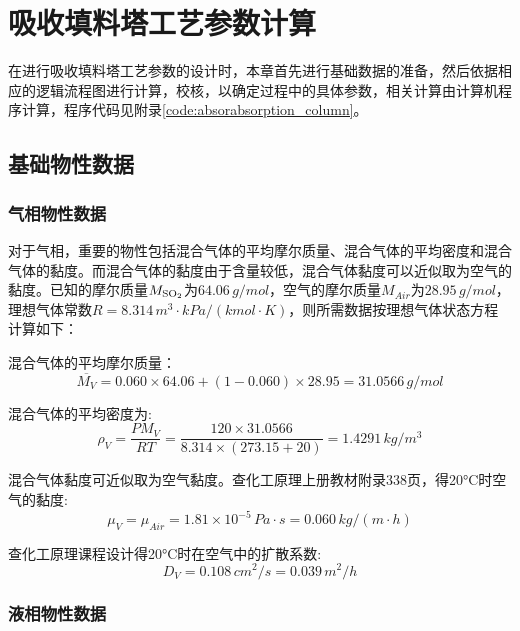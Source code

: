 \chapter{吸收填料塔工艺参数计算}

在进行吸收填料塔工艺参数的设计\cite{Design-of-Packed-Absorption-Column}时，本章首先进行基础数据的准备，然后依据相应的逻辑流程图进行计算，校核，以确定过程中的具体参数，相关计算由计算机程序计算，程序代码见附录\ref{code:absorabsorption_column}。

\section{基础物性数据}

\subsection{气相物性数据}

对于气相，重要的物性包括混合气体的平均摩尔质量、混合气体的平均密度和混合气体的黏度。而混合气体的黏度由于含量较低，混合气体黏度可以近似取为空气的黏度。已知的摩尔质量$M_{\ce{SO2}}$为$64.06 \, g/mol$，空气的摩尔质量$M_{Air}$为$28.95 \, g/mol$，理想气体常数$R=8.314 \, m^3 \cdot kPa/(kmol \cdot K)$，则所需数据按理想气体状态方程计算如下：

混合气体的平均摩尔质量：
\begin{equation}
	\overline{M_{V}} = 0.060 \times 64.06 + (1-0.060) \times 28.95 = 31.0566 \, g/mol
\end{equation}

混合气体的平均密度为:
\begin{equation}
	\rho_{V}=\frac{PM_{V}}{RT}=\frac{120\times31.0566}{8.314\times(273.15+20)}=1.4291 \, kg/m^3
\end{equation}

混合气体黏度可近似取为空气黏度。查化工原理上册教材附录338页，得20°C时空气的黏度:
\begin{equation}
	\mu_{V}	= \mu_{Air}=1.81\times10^{-5} \, Pa \cdot s = 0.060 \, kg/(m \cdot h)
\end{equation} 

查化工原理课程设计得20°C时在空气中的扩散系数:
\begin{equation}
	D_{V}=0.108 \, cm^2/s = 0.039 \, m^2/h
\end{equation}

\subsection{液相物性数据}

